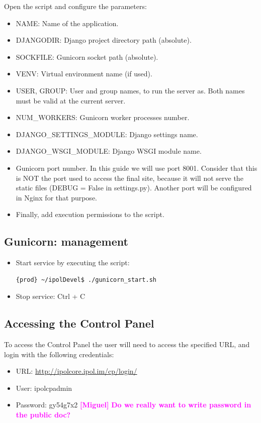 \documentclass[a4paper,12pt]{article}
\newcommand{\miguel}[1]{\textcolor{magenta}{\textbf{[Miguel]} \textbf{#1}}}
\begin{document}
Open the script and configure the parameters:
\begin{itemize}
\item NAME: Name of the application.
\item DJANGODIR: Django project directory path (absolute).
\item SOCKFILE: Gunicorn socket path (absolute).
\item VENV: Virtual environment name (if used).
\item USER, GROUP: User and group names, to run the server as. Both names must be valid at the current server.
\item NUM\_WORKERS: Gunicorn worker processes number.
\item DJANGO\_SETTINGS\_MODULE: Django settings name.
\item DJANGO\_WSGI\_MODULE: Django WSGI module name.
\item Gunicorn port number. In this guide we will use port 8001. Consider that this is NOT the port used to access the final site, because it will not serve the static files (DEBUG = False in settings.py). Another port will be configured in Nginx for that purpose.
\item Finally, add execution permissions to the script.
\end{itemize}

\subsection{Gunicorn: management}
\begin{itemize}
\item Start service by executing the script:
\begin{lstlisting}[language=Bash]
{prod} ~/ipolDevel$ ./gunicorn_start.sh
\end{lstlisting}

\item Stop service: Ctrl + C
\end{itemize}



\subsection{Accessing the Control Panel}
To access the Control Panel the user will need to access the specified URL, and login with the following credentials:

\begin{itemize}
\item URL: \url{http://ipolcore.ipol.im/cp/login/}

\item User: ipolcpadmin

\item Password: gy54g7x2 \miguel{Do we really want to write password in the public doc?}
\end{itemize}
\end{document}
